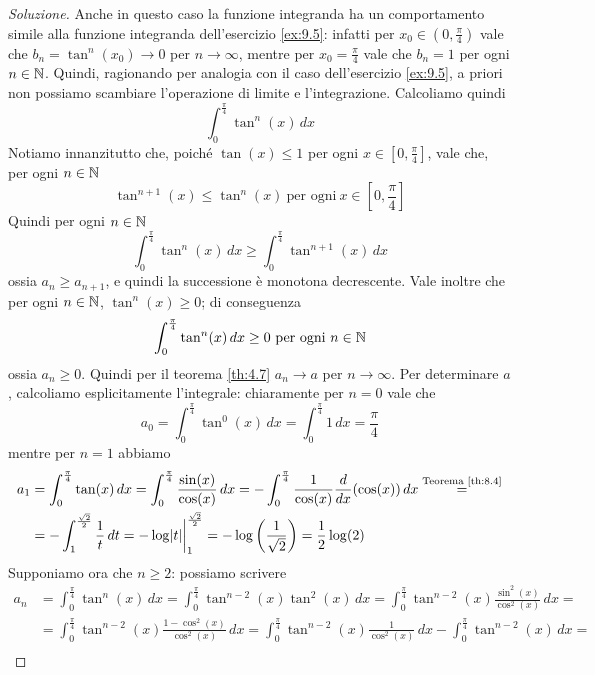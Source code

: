 \begin{proof}[Soluzione]
    Anche in questo caso la funzione integranda ha un comportamento simile alla funzione integranda dell'esercizio \ref{ex:9.5}: infatti per $x_0\in\left(0, \frac{\pi}{4}\right)$ vale che $b_n = \tan^n(x_0)\to 0$ per $n\to\infty$, mentre per $x_0=\frac{\pi}{4}$ vale che $b_n = 1$ per ogni $n\in\amsbb{N}$. Quindi, ragionando per analogia con il caso dell'esercizio \ref{ex:9.5}, a priori non possiamo scambiare l'operazione di limite e l'integrazione. Calcoliamo quindi
    \[
    \int_0^{\frac{\pi}{4}}\tan^n(x)\, dx
    \]
    Notiamo innanzitutto che, poiché $\tan(x)\le 1$ per ogni $x\in\left[0, \frac{\pi}{4}\right]$, vale che, per ogni $n\in\amsbb{N}$
    \[
    \tan^{n+1}(x)\le \tan^{n}(x) \ \text{per ogni} \ x\in\left[0, \frac{\pi}{4}\right]
    \]
    Quindi per ogni $n\in\amsbb{N}$
    \[
    \int_0^{\frac{\pi}{4}}\tan^n(x)\, dx \ge \int_0^{\frac{\pi}{4}}\tan^{n+1}(x)\, dx
    \]
    ossia $a_n \ge a_{n+1}$, e quindi la successione è monotona decrescente. Vale inoltre che per ogni $n\in\amsbb{N}$,  $\tan^n(x)\ge 0$; di conseguenza
    \[
    \int_0^{\frac{\pi}{4}}\tan^n(x)\, dx \ge 0 \ \text{per ogni} \ n\in\amsbb{N}
    \]
    ossia $a_n\ge 0$. Quindi per il teorema \ref{th:4.7} $a_n\to a$ per $n\to \infty$. Per determinare $a$, calcoliamo esplicitamente l'integrale: chiaramente per $n=0$ vale che
    \[
    a_0 = \int_0^{\frac{\pi}{4}}\tan^0(x)\, dx = \int_0^{\frac{\pi}{4}}1\, dx =\frac{\pi}{4} 
    \]
    mentre per $n=1$ abbiamo
    \[
    \begin{split}
        a_1 & = \int_0^{\frac{\pi}{4}}\tan(x)\, dx =\int_0^{\frac{\pi}{4}}\frac{\sin(x)}{\cos(x)}\, dx  = -\int_0^{\frac{\pi}{4}} \frac{1}{\cos(x)}\frac{d}{dx}(\cos(x))\, dx \overset{\text{Teorema \ref{th:8.4}}}{=}\\
        & =  -\int_1^{\frac{\sqrt{2}}{2}} \frac{1}{t}\, dt = -\log{\abs{t}}\bigg|_1^{\frac{\sqrt{2}}{2}} = -\log\left(\frac{1}{\sqrt{2}}\right) = \frac{1}{2}\log(2)
    \end{split}
    \]
    Supponiamo ora che $n\ge 2$: possiamo scrivere
    \[
    \begin{split}
        a_n  & = \int_0^{\frac{\pi}{4}}\tan^n(x)\, dx = \int_0^{\frac{\pi}{4}} \tan^{n-2}(x)\tan^2(x)\, dx = \int_0^{\frac{\pi}{4}} \tan^{n-2}(x) \frac{\sin^2(x)}{\cos^2(x)}\, dx =\\
        & = \int_0^{\frac{\pi}{4}} \tan^{n-2}(x) \frac{1-\cos^2(x)}{\cos^2(x)}\, dx = \int_0^{\frac{\pi}{4}} \tan^{n-2}(x) \frac{1}{\cos^2(x)}\, dx - \int_0^{\frac{\pi}{4}} \tan^{n-2}(x)\, dx = \\

\end{split}\]
\end{proof}
